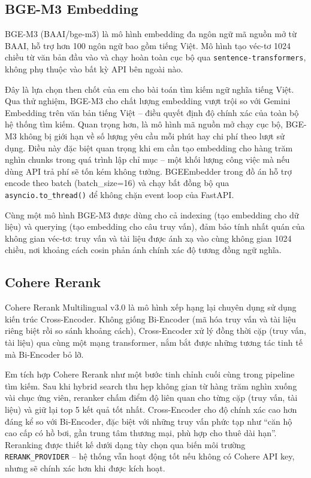 \subsection{BGE-M3 Embedding}

BGE-M3 (BAAI/bge-m3) là mô hình embedding đa ngôn ngữ mã nguồn mở từ BAAI, hỗ trợ hơn 100 ngôn ngữ bao gồm tiếng Việt. Mô hình tạo véc-tơ 1024 chiều từ văn bản đầu vào và chạy hoàn toàn cục bộ qua \texttt{sentence-transformers}, không phụ thuộc vào bất kỳ API bên ngoài nào.

Đây là lựa chọn then chốt của em cho bài toán tìm kiếm ngữ nghĩa tiếng Việt. Qua thử nghiệm, BGE-M3 cho chất lượng embedding vượt trội so với Gemini Embedding trên văn bản tiếng Việt -- điều quyết định độ chính xác của toàn bộ hệ thống tìm kiếm. Quan trọng hơn, là mô hình mã nguồn mở chạy cục bộ, BGE-M3 không bị giới hạn về số lượng yêu cầu mỗi phút hay chi phí theo lượt sử dụng. Điều này đặc biệt quan trọng khi em cần tạo embedding cho hàng trăm nghìn chunks trong quá trình lập chỉ mục -- một khối lượng công việc mà nếu dùng API trả phí sẽ tốn kém không tưởng. BGEEmbedder trong đồ án hỗ trợ encode theo batch (batch\_size=16) và chạy bất đồng bộ qua \texttt{asyncio.to\_thread()} để không chặn event loop của FastAPI.

Cùng một mô hình BGE-M3 được dùng cho cả indexing (tạo embedding cho dữ liệu) và querying (tạo embedding cho câu truy vấn), đảm bảo tính nhất quán của không gian véc-tơ: truy vấn và tài liệu được ánh xạ vào cùng không gian 1024 chiều, nơi khoảng cách cosin phản ánh chính xác độ tương đồng ngữ nghĩa.

\subsection{Cohere Rerank}

Cohere Rerank Multilingual v3.0 là mô hình xếp hạng lại chuyên dụng sử dụng kiến trúc Cross-Encoder. Không giống Bi-Encoder (mã hóa truy vấn và tài liệu riêng biệt rồi so sánh khoảng cách), Cross-Encoder xử lý đồng thời cặp (truy vấn, tài liệu) qua cùng một mạng transformer, nắm bắt được những tương tác tinh tế mà Bi-Encoder bỏ lỡ.

Em tích hợp Cohere Rerank như một bước tinh chỉnh cuối cùng trong pipeline tìm kiếm. Sau khi hybrid search thu hẹp không gian từ hàng trăm nghìn xuống vài chục ứng viên, reranker chấm điểm độ liên quan cho từng cặp (truy vấn, tài liệu) và giữ lại top 5 kết quả tốt nhất. Cross-Encoder cho độ chính xác cao hơn đáng kể so với Bi-Encoder, đặc biệt với những truy vấn phức tạp như ``căn hộ cao cấp có hồ bơi, gần trung tâm thương mại, phù hợp cho thuê dài hạn''. Reranking được thiết kế dưới dạng tùy chọn qua biến môi trường \texttt{RERANK\_PROVIDER} -- hệ thống vẫn hoạt động tốt nếu không có Cohere API key, nhưng sẽ chính xác hơn khi được kích hoạt.

